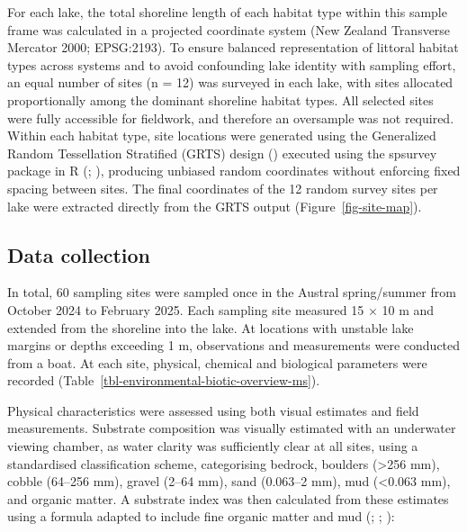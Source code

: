 \documentclass[
  letterpaper,
  DIV=11,
  numbers=noendperiod]{scrartcl}
\begin{document}
For each lake, the total shoreline length of each habitat type within
this sample frame was calculated in a projected coordinate system (New
Zealand Transverse Mercator 2000; EPSG:2193). To ensure balanced
representation of littoral habitat types across systems and to avoid
confounding lake identity with sampling effort, an equal number of sites
(n = 12) was surveyed in each lake, with sites allocated proportionally
among the dominant shoreline habitat types. All selected sites were
fully accessible for fieldwork, and therefore an oversample was not
required. Within each habitat type, site locations were generated using
the Generalized Random Tessellation Stratified (GRTS) design
() executed using the
spsurvey package in R (;
), producing unbiased
random coordinates without enforcing fixed spacing between sites. The
final coordinates of the 12 random survey sites per lake were extracted
directly from the GRTS output (Figure~\ref{fig-site-map}).

\subsection{Data collection}\label{data-collection}

In total, 60 sampling sites were sampled once in the Austral
spring/summer from October 2024 to February 2025. Each sampling site
measured 15 × 10 m and extended from the shoreline into the lake. At
locations with unstable lake margins or depths exceeding 1 m,
observations and measurements were conducted from a boat. At each site,
physical, chemical and biological parameters were recorded
(Table~\ref{tbl-environmental-biotic-overview-ms}).

Physical characteristics were assessed using both visual estimates and
field measurements. Substrate composition was visually estimated with an
underwater viewing chamber, as water clarity was sufficiently clear at
all sites, using a standardised classification scheme, categorising
bedrock, boulders (\textgreater256 mm), cobble (64--256 mm), gravel
(2--64 mm), sand (0.063--2 mm), mud (\textless0.063 mm), and organic
matter. A substrate index was then calculated from these estimates using
a formula adapted to include fine organic matter and mud
(;
;
):
\end{document}
